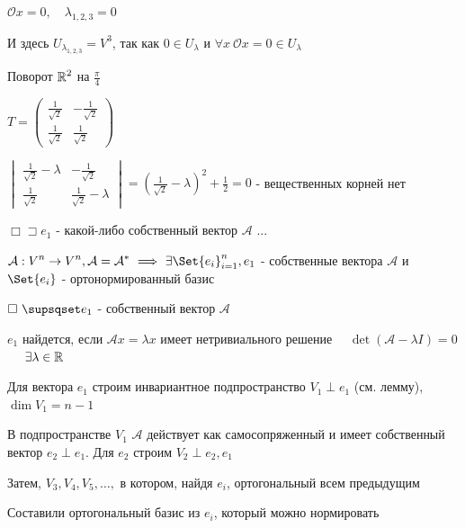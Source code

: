 \documentclass[12pt]{article}
\begin{document}
    $\displaystyle \mathcal{O}x = 0, \quad \lambda_{1,2,3} = 0$

    И здесь $\displaystyle U_{\lambda_{1,2,3}} = V^3$, так как $\displaystyle 0 \in U_\lambda$ и $\displaystyle \forall x \ \mathcal{O}x = 0 \in U_\lambda$

     Поворот $\displaystyle \mathbb{R}^2$ на $\displaystyle \frac{\pi}{4}$

    $\displaystyle T = \begin{pmatrix}\frac{1}{\sqrt{2}} & -\frac{1}{\sqrt{2}} \\ \frac{1}{\sqrt{2}} & \frac{1}{\sqrt{2}}\end{pmatrix}$

    $\displaystyle \begin{vmatrix}\frac{1}{\sqrt{2}} - \lambda & -\frac{1}{\sqrt{2}} \\ \frac{1}{\sqrt{2}} & \frac{1}{\sqrt{2}} - \lambda\end{vmatrix} =
    \left(\frac{1}{\sqrt{2}} - \lambda\right)^2 + \frac{1}{2} = 0$ - вещественных корней нет

    $\displaystyle \Box \sqsupset e_1$ - какой-либо собственный вектор $\mathcal{A}$ ...



    \Th $\displaystyle \mathcal{A}: V^n \to V^n, \mathcal{A} = \mathcal{A}^* \ \Longrightarrow \ \exists \Set{e_i}^n_{i=1}, e_1$ -
    собственные вектора $\mathcal{A}$ и $\displaystyle \Set{e_i}$ - ортонормированный базис

    $\displaystyle \Box \ \supsqset e_1$ - собственный вектор $\mathcal{A}$

    $\displaystyle e_1$ найдется, если $\mathcal{A}x = \lambda x$ имеет нетривиального решение \ \Longleftrightarrow \
    $\det(\mathcal{A} - \lambda I) = 0$ \  \ $\exists \lambda \in \mathbb{R}$

    Для вектора $\displaystyle e_1$ строим инвариантное подпространство $\displaystyle V_1 \perp e_1$ (см. лемму), $\displaystyle \dim V_1 = n - 1$

    В подпространстве $\displaystyle V_1$ $\mathcal{A}$ действует как самосопряженный и имеет собственный вектор $\displaystyle e_2 \perp e_1$.
    Для $\displaystyle e_2$ строим $\displaystyle V_2 \perp e_2, e_1$

    Затем, $\displaystyle V_3, V_4, V_5, \dots,$ в котором, найдя $\displaystyle e_i$, ортогональный всем предыдущим

    Составили ортогональный базис из $\displaystyle e_i$, который можно нормировать
\end{document}
